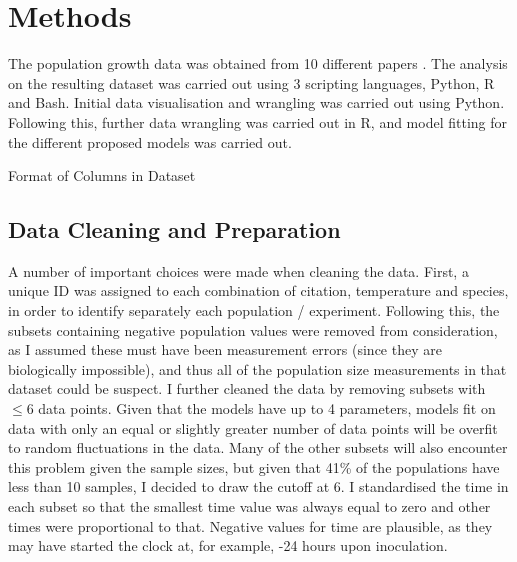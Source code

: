 \documentclass[11pt,a4wide,titlepage]{article}
\begin{document}
\section*{Methods}
The population growth data was obtained from 10 different papers \citep{baeGrowthCharacteristicsBiofilm2014a,bernhardtMetabolicTheoryTemperatureSize2018,galarzPredictingBacterialGrowth2016,gillGrowthEscherichiaColi1991,phillipsRelationTemperatureGrowth1987,rothContinuityPsychrophilicMesophilic1962,silvaModellingGrowthLactic2018,sivonenEffectsLightTemperature1990,stannardTemperatureGrowthRelationships1985,zwieteringModelingBacterialGrowth1994}. The analysis on the resulting dataset was carried out using 3 scripting languages, Python, R and Bash. Initial data visualisation and wrangling was carried out using Python. Following this, further data wrangling was carried out in R, and model fitting for the different proposed models was carried out.\newline

\begin{table}
\begin{center}
	\caption{Format of Columns in Dataset}
	\newline
\end{center}
\end{table}

\subsection*{Data Cleaning and Preparation}
A number of important choices were made when cleaning the data. First, a unique ID was assigned to each combination of citation, temperature and species, in order to identify separately each population / experiment. Following this, the subsets containing negative population values were removed from consideration, as I assumed these must have been measurement errors (since they are biologically impossible), and thus all of the population size measurements in that dataset could be suspect. I further cleaned the data by removing subsets with $\le 6$ data points. Given that the models have up to 4 parameters, models fit on data with only an equal or slightly greater number of data points will be overfit to random fluctuations in the data. Many of the other subsets will also encounter this problem given the sample sizes, but given that 41\% of the populations have less than 10 samples, I decided to draw the cutoff at 6. I standardised the time in each subset so that the smallest time value was always equal to zero and other times were proportional to that. Negative values for time are plausible, as they may have started the clock at, for example, -24 hours upon inoculation.
\end{document}
